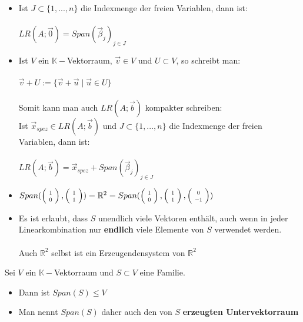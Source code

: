 \documentclass[titlepage]{article}
\newcommand{\K}{\mathbb{K}}
\newcommand{\R}{\mathbb{R}}
\newcommand{\1}{\mathbb{1}}
\newcommand{\0}{\mathbb{0}}
\begin{document}
					\begin{itemize}
						\item Ist $J\subset\{1,...,n\}$ die Indexmenge der freien Variablen, dann ist: \\\\
						\underline{\underline{$LR(A;\vec{0})=Span(\vec{\beta}_j)_{j\in J}$}}
						\item Ist $V$ ein $\K-$Vektorraum, $\vec{v}\in V$ und $U\subset V$, so schreibt man:
						\\\\\underline{\underline{$\vec{v}+U:=\{\vec{v}+\vec{u}\mid\vec{u}\in U\}$ }}
						\\\\Somit kann man auch $LR(A;\vec{b})$ kompakter schreiben: \\Ist $\vec{x}_{spez}\in LR(A;\vec{b})$ und $J\subset\{1,...,n\}$ die Indexmenge der freien Variablen, dann ist: \\\\ \underline{\underline{$LR(A;\vec{b})=\vec{x}_{spez}+Span(\vec{\beta}_j)_{j\in J}$}}
						\item $Span(\left(\scalebox{0.7}{$\begin{array}{c} 1 \\ 0 \end{array}$}\right),\left(\scalebox{0.7}{$\begin{array}{c} 1 \\ 1 \end{array}$}\right))=\R^2=Span(\left(\scalebox{0.7}{$\begin{array}{c} 1 \\ 0 \end{array}$}\right),\left(\scalebox{0.7}{$\begin{array}{c} 1 \\ 1 \end{array}$}\right),\left(\scalebox{0.7}{$\begin{array}{c} 0 \\ -1 \end{array}$}\right))$
						\item Es ist erlaubt, dass $S$ unendlich viele Vektoren enthält, auch wenn in jeder Linearkombination nur \textbf{endlich} viele Elemente von $S$ verwendet werden.\\\\
						Auch $\R^2$ selbst ist ein Erzeugendensystem von $\R^2$
					\end{itemize}
					Sei $V$ ein $\K-$Vektorraum und $S\subset V$ eine Familie.
					\begin{itemize}
						\item Dann ist $Span(S)\le V$
						\item Man nennt $Span(S)$ daher auch den von $S$ \textbf{erzeugten Untervektorraum}
					\end{itemize}
\end{document}
